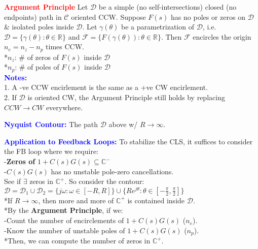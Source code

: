 \documentclass[5pt]{extarticle} %
\begin{document}
\begin{paracol}{3}
{    \textcolor{red}{\textbf{Argument Principle}} Let $\mathcal{D}$ be a simple (no self-intersections) closed (no endpoints) path in $\mathcal{C}$ oriented CCW. 
    Suppose $F(s)$ has no poles or zeros on $\mathcal{D}$ \& isolated poles inside $\mathcal{D}$. Let $\gamma(\theta)$ be a parametrization of $\mathcal{D}$, i.e. $\mathcal{D} = \{ \gamma(\theta) : \theta \in \mathbb{R}\}$ 
    and $\mathcal{F} = \{F(\gamma(\theta)) : \theta \in \mathbb{R}\}$. Then $\mathcal{F}$ encircles the origin $n_e = n_z - n_p$ times CCW. \\
    *$n_z$: \# of zeros of $F(s)$ inside $\mathcal{D}$ \\
    *$n_p$: \# of poles of $F(s)$ inside $\mathcal{D}$ \\

    \textcolor{blue}{\textbf{Notes:}} \\
    1. A -ve CCW encirlement is the same as a +ve CW encirlement. \\    
    2. If $\mathcal{D}$ is oriented CW, the Argument Principle still holds by replacing $CCW \rightarrow CW$ everywhere.

    \textcolor{blue}{\textbf{Nyquist Contour:}} The path $\mathcal{D}$ above w/ $R \rightarrow \infty$. 

    \textcolor{blue}{\textbf{Application to Feedback Loops:}} To stabilize the CLS, it suffices to consider the FB loop where we require: \\
    -\textbf{Zeros of} \( 1 + C(s) G(s) \subseteq \mathbb{C}^- \) \textcolor{red}{} \\
    -\( C(s)G(s) \) has no unstable pole-zero cancellations. \\
    
    See if $\exists$ zeros in \( \mathbb{C}^+ \). So consider the contour: \\
    $\mathcal{D} = \mathcal{D}_1 \cup \mathcal{D}_2 = \{ j\omega : \omega \in [-R, R] \} \cup \{ R e^{j\theta} : \theta \in [-\frac{\pi}{2}, \frac{\pi}{2}] \}$ \\
    *If \( R \to \infty \), then more and more of \( \mathbb{C}^+ \) is contained inside \( \mathcal{D} \). \\
    *By the \textbf{Argument Principle}, if we: \\
    -Count the number of encirclements of \( 1 + C(s)G(s) \) (\( n_e \)). \\
    -Know the number of unstable poles of \( 1 + C(s)G(s) \) (\( n_p \)). \\
    *Then, we can compute the number of zeros in \( \mathbb{C}^+ \).

        }
\end{paracol}
\end{document}
